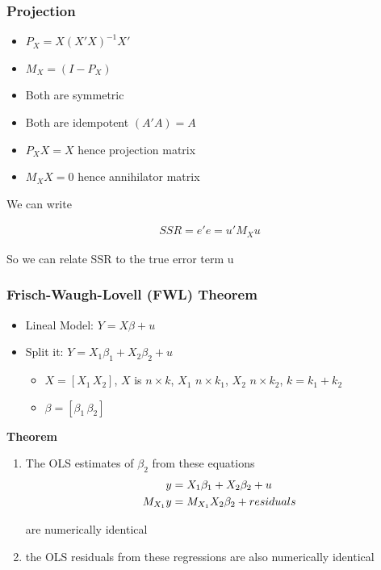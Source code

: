 \documentclass[
  shownotes,
  xcolor={svgnames},
  hyperref={colorlinks,citecolor=DarkBlue,linkcolor=DarkRed,urlcolor=DarkBlue}
  , aspectratio=169]{beamer}
\begin{document}
\begin{frame}
\frametitle{Projection}

\begin{itemize}
\item $P_X=X(X'X)^{-1}X'$ 
\item $M_X=(I-P_X)$
\end{itemize}

\begin{itemize}
  \item Both are symmetric
  \item Both are idempotent $(A'A)=A$
  \item $P_XX=X$ hence projection matrix
  \item $M_XX=0$ hence annihilator matrix
\end{itemize}

We can write

\begin{align}
SSR = e'e = u'M_Xu
\end{align}

So we can relate SSR to the true error term u
\end{frame}
\begin{frame}
\frametitle{Frisch-Waugh-Lovell (FWL) Theorem}
\begin{itemize}
\item Lineal Model: $Y=X\beta +u$
\item Split it: $Y=X_1 \beta_1 + X_2 \beta_2 +u$
  \begin{itemize}
    \footnotesize
  \item $X=[X_1\,X_2]$, $X$ is $n\times k$, $X_1$ $n\times k_1$, $X_2$ $n\times k_2$, $k=k_1+k_2$
  \item $\beta = [\beta_1 \, \beta_2]$ 
  \end{itemize}
\end{itemize}


{\bf Theorem}
\begin{enumerate}
  \item The OLS estimates of $\beta_2$ from these equations
  \begin{align}
  y &= X_1 \beta_1 +X_2 \beta_2 +u  \\
  \medskip
  M_{X_1}y &= M_{X_1}X_2 \beta_2 + residuals 
  \end{align}

  are numerically identical
  \bigskip
  \item the OLS residuals from these regressions are also numerically identical
\end{enumerate}


\end{frame}
\end{document}

